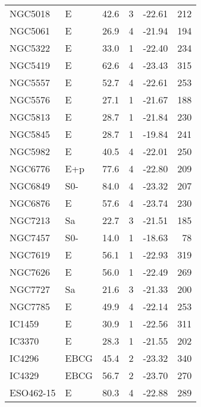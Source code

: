 \begin{tabular}{llrccr}
NGC5018        & E      &  42.6 & 3 &  -22.61 & 212\\
NGC5061        & E      &  26.9 & 4 &  -21.94 & 194\\
NGC5322        & E      &  33.0 & 1 &  -22.40 & 234\\
NGC5419        & E      &  62.6 & 4 &  -23.43 & 315\\
NGC5557        & E      &  52.7 & 4 &  -22.61 & 253\\
NGC5576        & E      &  27.1 & 1 &  -21.67 & 188\\
NGC5813        & E      &  28.7 & 1 &  -21.84 & 230\\
NGC5845        & E      &  28.7 & 1 &  -19.84 & 241\\
NGC5982        & E      &  40.5 & 4 &  -22.01 & 250\\
NGC6776        & E+p    &  77.6 & 4 &  -22.80 & 209\\
NGC6849        & S0-    &  84.0 & 4 &  -23.32 & 207\\
NGC6876        & E      &  57.6 & 4 &  -23.74 & 230\\
NGC7213        & Sa     &  22.7 & 3 &  -21.51 & 185\\
NGC7457        & S0-    &  14.0 & 1 &  -18.63 &  78\\
NGC7619        & E      &  56.1 & 1 &  -22.93 & 319\\
NGC7626        & E      &  56.0 & 1 &  -22.49 & 269\\
NGC7727        & Sa     &  21.6 & 3 &  -21.33 & 200\\
NGC7785        & E      &  49.9 & 4 &  -22.14 & 253\\
IC1459         & E      &  30.9 & 1 &  -22.56 & 311\\
IC3370         & E      &  28.3 & 1 &  -21.55 & 202\\
IC4296         & EBCG  & 45.4 & 2 &  -23.32 & 340\\
IC4329         & EBCG  &  56.7 & 2 &  -23.70 & 270\\
ESO462-15     & E      &  80.3 & 4 &  -22.88 & 289\\
\end{tabular}
